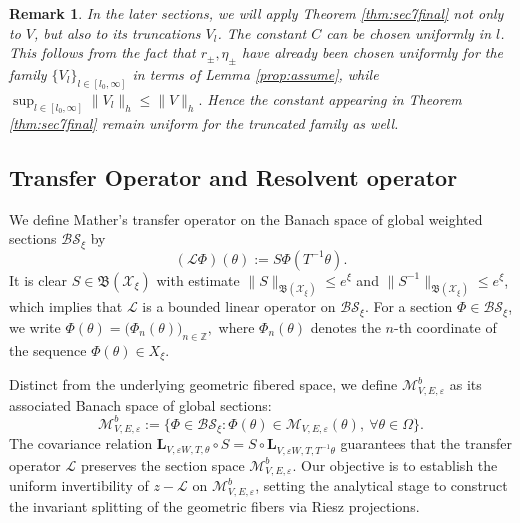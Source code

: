 \documentclass[reqno,11pt]{amsart}
\newtheorem{remark}{Remark}[section]
\begin{document}
\begin{remark}\label{uniform-constant}
    In the later sections, we will apply Theorem \ref{thm:sec7final} not only to $V$, but also to its truncations $V_l$. The constant $C$ can be chosen uniformly in $l$. This follows from the fact that  $r_\pm,\eta_\pm$ have already been chosen uniformly for the family $\{V_l\}_{l\in[l_0,\infty]}$ in terms of Lemma \ref{prop:assume}, while
$
\sup_{l\in[l_0,\infty]}\|V_l\|_h\le \|V\|_h.
$
Hence the constant appearing in Theorem \ref{thm:sec7final} remain uniform for the truncated family as well.
\end{remark}





\subsection{Transfer Operator and Resolvent operator}

We define Mather's transfer operator on the Banach space of global weighted sections $\mathcal{BS}_\xi$ by
\begin{equation}\label{mather-operator}(\mathcal{ L }\Phi)(\theta) := S\Phi(T^{-1}\theta).\end{equation}
It is clear $S\in \mathfrak{B}(\mathcal{X}_{\xi})$ with estimate $\|S\|_{\mathfrak{B}(\mathcal{X}_{\xi})} \le e^\xi$ and $\|S^{-1}\|_{\mathfrak{B}(\mathcal{X}_{\xi})} \le e^\xi$, which implies that $\mathcal{ L }$ is a bounded linear operator on $\mathcal{BS}_\xi$.
For a section $\Phi\in\mathcal{BS}_\xi$, we write
$
\Phi(\theta)=\bigl(\Phi_n(\theta)\bigr)_{n\in\mathbb Z},
$
where $\Phi_n(\theta)$ denotes the $n$-th coordinate of the sequence
$\Phi(\theta)\in X_\xi$.


Distinct from the underlying geometric fibered space, we define $\mathcal{M}_{V,E,\varepsilon}^b$ as its associated Banach space of global sections:
$$\mathcal{M}_{V,E,\varepsilon}^b := \bigl\{ \Phi\in \mathcal{BS}_\xi : \Phi(\theta) \in \mathcal{M}_{V,E,\varepsilon}(\theta), \ \forall \theta\in\Omega \bigr\}.$$
The covariance relation $\mathbf{L}_{V,\varepsilon W,T,\theta} \circ S = S \circ \mathbf{L}_{V,\varepsilon W,T,T^{-1}\theta}$  guarantees that the transfer operator $\mathcal{L}$ preserves the section space $\mathcal{M}_{V,E,\varepsilon}^b$. Our objective  is to establish the uniform invertibility of $z-\mathcal{L}$ on $\mathcal{M}_{V,E,\varepsilon}^b$, setting the analytical stage to construct the invariant splitting of the geometric fibers via Riesz projections.
\end{document}

